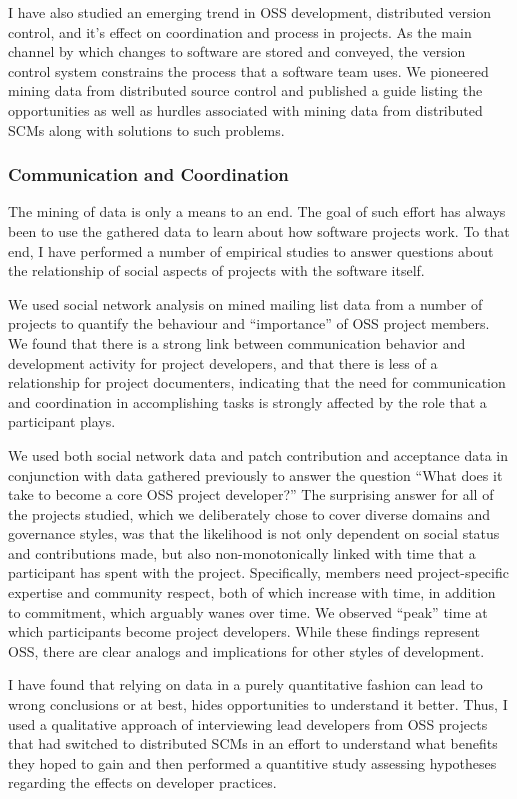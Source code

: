 \documentclass[10pt]{article}
\newcommand\Subsection[1]{\subsubsection*{\small #1}}
\begin{document}
\begin{small}
I have also studied an emerging trend in OSS development, distributed version
control, and it's effect on coordination and process in projects.  As the main
channel by which changes to software are stored and conveyed, the version
control system constrains the process that a software team uses.  We pioneered
mining data from distributed source control and published a guide listing the
opportunities as well as hurdles associated with mining data from distributed
SCMs along with solutions to such problems.


\Subsection{Communication and Coordination}

The mining of data is only a means to an end.  The goal of such
effort has always been to use the gathered data to learn about how software
projects work.  To that end, I have performed a number of empirical studies
to answer questions about the relationship of social aspects of projects
with the software itself.

We used social network analysis on mined mailing list data from a number of projects 
to quantify the behaviour and ``importance'' of OSS project members.
We found that there is a strong link between communication behavior and
development activity for project developers, and that there is less of a
relationship for project documenters, indicating that the need for communication and
coordination in accomplishing tasks is strongly affected by the role that a
participant plays.

We used both social network data and patch contribution and acceptance data in
conjunction with data gathered previously to answer the question ``What does it
take to become a core OSS project developer?'' The surprising answer for all of
the projects studied, which we deliberately chose to cover diverse domains and
governance styles, was that the likelihood is not only dependent on social
status and contributions made, but also non-monotonically linked with time that
a participant has spent with the project.  Specifically, members need
project-specific expertise and community respect, both of which increase with
time, in addition to commitment, which arguably wanes over time.  We observed
``peak'' time at which participants become project developers.  While these
findings represent OSS, there are clear analogs and implications
for other styles of development.

I have found that relying on data in a
purely quantitative fashion can lead to wrong conclusions or at best, hides
opportunities to understand it better.  Thus, I used a qualitative approach of
interviewing lead developers from OSS
projects that had switched to distributed SCMs in an effort to understand what
benefits they hoped to gain and then performed a quantitive study
assessing hypotheses regarding the effects on developer practices.


\end{small}
\end{document}
